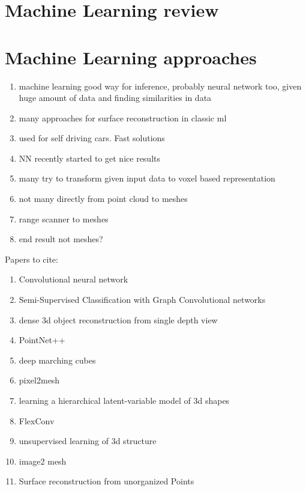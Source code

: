 \section{Machine Learning review}
\label{ml_review}

\section{Machine Learning approaches}
\label{ml_approaches}
\begin{enumerate}
  \item machine learning good way for inference, probably neural network too, given huge amount of data and finding similarities in data
  \item many approaches for surface reconstruction in classic ml
  \item used for self driving cars. Fast solutions
  \item NN recently started to get nice results
  \item many try to transform given input data to voxel based representation
  \item not many directly from point cloud to meshes
  \item range scanner to meshes
  \item end result not meshes?
\end{enumerate}
Papers to cite:
\begin{enumerate}
  \item Convolutional neural network
  \item Semi-Supervised Classification with Graph Convolutional networks
  \item dense 3d object reconstruction from single depth view
  \item PointNet++
  \item deep marching cubes
  \item pixel2mesh
  \item learning a hierarchical latent-variable model of 3d shapes
  \item FlexConv
  \item unsupervised learning of 3d structure
  \item image2 mesh
  \item Surface reconstruction from unorganized Points
\end{enumerate}
